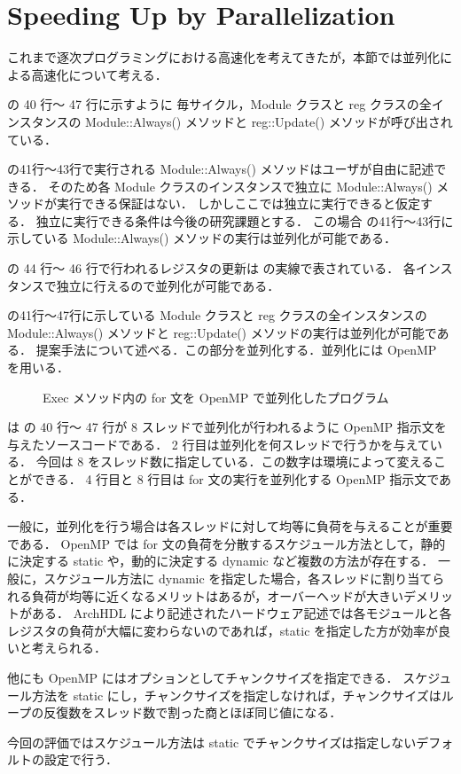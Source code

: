 \section{Speeding Up by Parallelization} \label{ss:parallel}

これまで逐次プログラミングにおける高速化を考えてきたが，本節では並列化による高速化について考える．

 の 40 行〜 47 行に示すように
毎サイクル，Module クラスと reg クラスの全インスタンスの Module::Always() メソッドと reg::Update() メソッドが呼び出されている．

 の41行〜43行で実行される Module::Always() メソッドはユーザが自由に記述できる．
そのため各 Module クラスのインスタンスで独立に Module::Always() メソッドが実行できる保証はない．
しかしここでは独立に実行できると仮定する．
独立に実行できる条件は今後の研究課題とする．
この場合 の41行〜43行に示している Module::Always() メソッドの実行は並列化が可能である．

 の 44 行〜 46 行で行われるレジスタの更新は の実線で表されている．
各インスタンスで独立に行えるので並列化が可能である．

 の41行〜47行に示している Module クラスと reg クラスの全インスタンスの Module::Always() メソッドと reg::Update() メソッドの実行は並列化が可能である．
提案手法について述べる．この部分を並列化する．並列化には OpenMP~\cite{openmp} を用いる．

\begin{figure}[t]
 
 \caption{Exec メソッド内の for 文を OpenMP で並列化したプログラム}
 \label{src:exec_openmp}
\end{figure}

 は の 40 行〜 47 行が 8 スレッドで並列化が行われるように OpenMP 指示文を与えたソースコードである．
2 行目は並列化を何スレッドで行うかを与えている．
今回は 8 をスレッド数に指定している．この数字は環境によって変えることができる．
4 行目と 8 行目は for 文の実行を並列化する OpenMP 指示文である．

一般に，並列化を行う場合は各スレッドに対して均等に負荷を与えることが重要である．
OpenMP では for 文の負荷を分散するスケジュール方法として，静的に決定する static や，動的に決定する dynamic など複数の方法が存在する．
一般に，スケジュール方法に dynamic を指定した場合，各スレッドに割り当てられる負荷が均等に近くなるメリットはあるが，オーバーヘッドが大きいデメリットがある．
ArchHDL により記述されたハードウェア記述では各モジュールと各レジスタの負荷が大幅に変わらないのであれば，static を指定した方が効率が良いと考えられる．

他にも OpenMP にはオプションとしてチャンクサイズを指定できる．
スケジュール方法を static にし，チャンクサイズを指定しなければ，チャンクサイズはループの反復数をスレッド数で割った商とほぼ同じ値になる．

今回の評価ではスケジュール方法は static でチャンクサイズは指定しないデフォルトの設定で行う．
